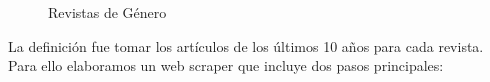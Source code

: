 \documentclass[a4paper]{article}
\begin{document}
\begin{figure}[H]
\centering
{}
\caption{Revistas de G\'enero} \label{fig:logos}
\end{figure}

La definici\'on fue tomar los art\'iculos de los \'ultimos 10 a\~nos para cada revista.\\
Para ello elaboramos un web scraper que incluye dos pasos principales:
\end{document}

